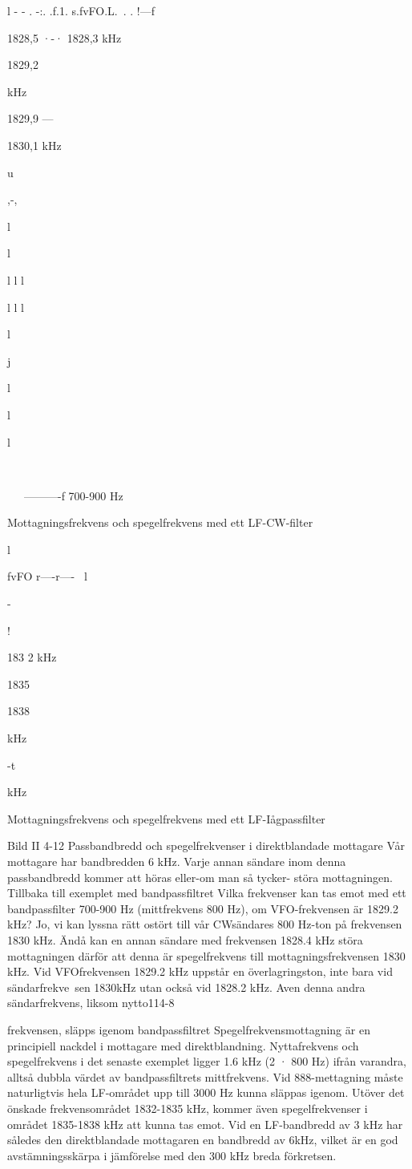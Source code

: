 \documentclass[a4paper,twoside,twocolumn,openright]{book}
\begin{document}
{{{l - - . -:. .f.1. s.fvFO.L.~. . !\----f

1828,5 ·-·
1828,3 kHz

1829,2

kHz

1829,9 ---

1830,1 kHz

u

,-,

l

l

l
l
l

l
l
l

l

j

l

l

l

\

~~~----------f
700-900 Hz

Mottagningsfrekvens och spegelfrekvens
med ett LF-CW-filter

l

fvFO
r----r----~
l

-

!

183 2
kHz

1835

1838

kHz

-t

kHz

Mottagningsfrekvens och spegelfrekvens
med ett LF-Iågpassfilter

Bild II 4-12 Passbandbredd och spegelfrekvenser i direktblandade mottagare
Vår mottagare har bandbredden 6 kHz.
Varje annan sändare inom denna passbandbredd kommer att höras eller-om man
så tycker- störa mottagningen.
Tillbaka till exemplet med bandpassfiltret
Vilka frekvenser kan tas emot med ett
bandpassfilter 700-900 Hz (mittfrekvens 800
Hz), om VFO-frekvensen är 1829.2 kHz?
Jo, vi kan lyssna rätt ostört till vår CWsändares 800 Hz-ton på frekvensen 1830
kHz. Ändå kan en annan sändare med
frekvensen 1828.4 kHz störa mottagningen
därför att denna är spegelfrekvens till mottagningsfrekvensen 1830 kHz. Vid VFOfrekvensen 1829.2 kHz uppstår en överlagringston, inte bara vid sändarfrekve~sen
1830kHz utan också vid 1828.2 kHz. Aven
denna andra sändarfrekvens, liksom nytto114-8

frekvensen, släpps igenom bandpassfiltret
Spegelfrekvensmottagning är en principiell nackdel i mottagare med direktblandning. Nyttafrekvens och spegelfrekvens i
det senaste exemplet ligger 1.6 kHz (2 · 800
Hz) ifrån varandra, alltså dubbla värdet av
bandpassfiltrets mittfrekvens.
Vid 888-mettagning måste naturligtvis
hela LF-området upp till 3000 Hz kunna
släppas igenom. Utöver det önskade frekvensområdet 1832-1835 kHz, kommer även
spegelfrekvenser i området 1835-1838 kHz
att kunna tas emot.
Vid en LF-bandbredd av 3 kHz har således den direktblandade mottagaren en bandbredd av 6kHz, vilket är en god avstämningsskärpa i jämförelse med den 300 kHz breda
förkretsen.

}}}
\end{document}
